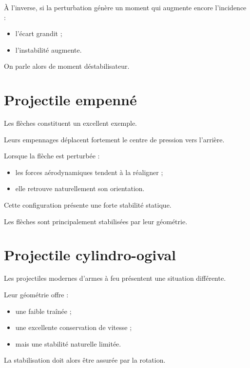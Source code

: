À l'inverse, si la perturbation génère un moment qui augmente encore
l'incidence :

\begin{itemize}
    \item l'écart grandit ;
    \item l'instabilité augmente.
\end{itemize}

On parle alors de moment déstabilisateur.

\section{Projectile empenné}

Les flèches constituent un excellent exemple.

Leurs empennages déplacent fortement le centre de pression vers l'arrière.

Lorsque la flèche est perturbée :

\begin{itemize}
    \item les forces aérodynamiques tendent à la réaligner ;
    \item elle retrouve naturellement son orientation.
\end{itemize}

Cette configuration présente une forte stabilité statique.

\begin{aretenir}

Les flèches sont principalement stabilisées par leur géométrie.

\end{aretenir}

\section{Projectile cylindro-ogival}

Les projectiles modernes d'armes à feu présentent une situation différente.

Leur géométrie offre :

\begin{itemize}
    \item une faible traînée ;
    \item une excellente conservation de vitesse ;
    \item mais une stabilité naturelle limitée.
\end{itemize}

La stabilisation doit alors être assurée par la rotation.

